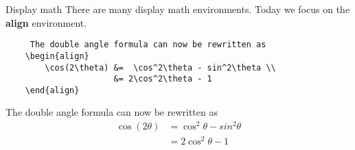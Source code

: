 \copyrightTim

\begin{frame}[fragile]{Display math}
    There are many display math environments. Today we focus on the \textbf{align} environment.

    \begin{verbatim}
     The double angle formula can now be rewritten as   
    \begin{align}
        \cos(2\theta) &=  \cos^2\theta - sin^2\theta \\
                      &= 2\cos^2\theta - 1 
    \end{align}
\end{verbatim}
The double angle formula can now be rewritten as
    \begin{align}
        \cos(2\theta) &=  \cos^2\theta - sin^2\theta \\
                      &= 2\cos^2\theta - 1 
    \end{align}


\end{frame}